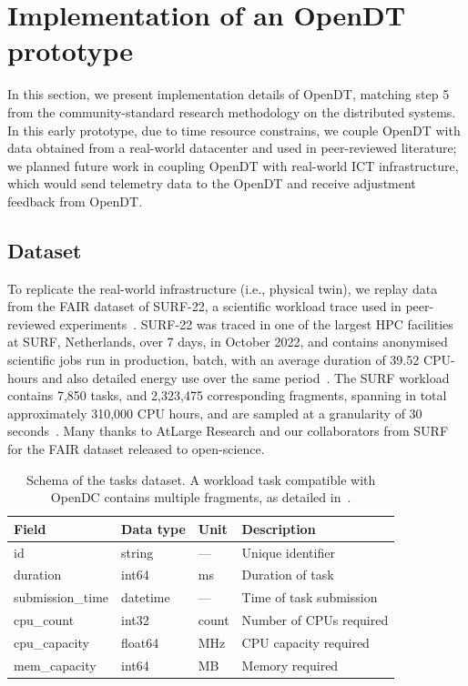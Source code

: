 \section{Implementation of an OpenDT prototype}\label{sec:prototype}
In this section, we present implementation details of OpenDT, matching step 5 from the community-standard research methodology on the distributed systems. In this early prototype, due to time resource constrains, we couple OpenDT with data obtained from a real-world datacenter and used in peer-reviewed literature; we planned future work in coupling OpenDT with real-world ICT infrastructure, which would send telemetry data to the OpenDT and receive adjustment feedback from OpenDT.


\subsection{Dataset}\label{sec:dataset}

To replicate the real-world infrastructure (i.e., physical twin), we replay data from the FAIR dataset of SURF-22, a scientific workload trace used in peer-reviewed experiments~\cite{DBLP:conf/wosp/NiewenhuisTIM24, nicolae5377101m3sa}. SURF-22 was traced in one of the largest HPC facilities at SURF, Netherlands, over 7 days, in October 2022, and contains anonymised scientific jobs run in production, batch, with an average duration of 39.52 CPU-hours and also detailed energy use over the same period~\cite{nicolae5377101m3sa}. The SURF workload contains 7,850 tasks, and 2,323,475 corresponding fragments, spanning in total approximately 310,000 CPU hours, and are sampled at a granularity of 30 seconds~\cite{nicolae5377101m3sa}. Many thanks to AtLarge Research and our collaborators from SURF for the FAIR dataset released to open-science.


\begin{table}[t]
\centering
\renewcommand{\arraystretch}{1.1}
\begin{tabularx}{\linewidth}{l l l X}
\toprule
\textbf{Field} & \textbf{Data type} & \textbf{Unit} & \textbf{Description} \\
\midrule
id               & string   & —    & Unique identifier \\
duration         & int64    & ms   & Duration of task \\
submission\_time  & datetime & —    & Time of task submission \\
cpu\_count       & int32    & count& Number of CPUs required \\
cpu\_capacity     & float64  & MHz  & CPU capacity required \\
mem\_capacity     & int64    & MB   & Memory required \\
\bottomrule
\end{tabularx}
\caption{Schema of the tasks dataset. A workload task compatible with OpenDC contains multiple fragments, as detailed in~\cite{opendc-workload}.}
\label{tab:tasks_schema}
\end{table}


